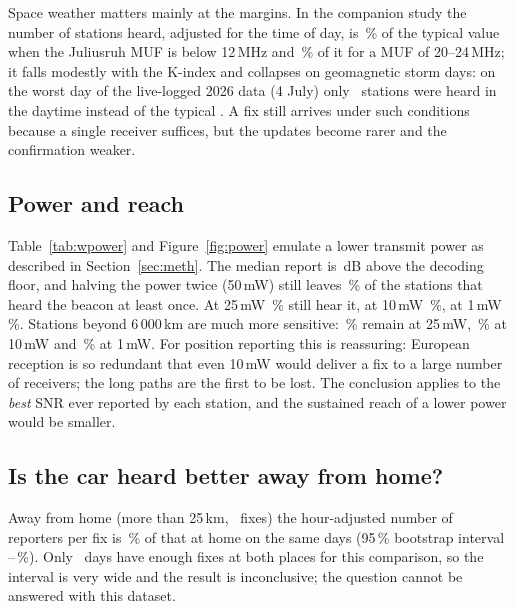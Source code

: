 \documentclass[10pt,a4paper]{article}
\begin{document}
Space weather matters mainly at the margins. In the companion study the number of stations heard, adjusted for the time of day, is \mufIdxLow\,\% of the typical value when the Juliusruh MUF is below 12\,MHz and \mufIdxMid\,\% of it for a MUF of 20--24\,MHz; it falls modestly with the K-index and collapses on geomagnetic storm days: on the worst day of the live-logged 2026 data (4 July) only \caseJulyRep\ stations were heard in the daytime instead of the typical \caseTypRep. A fix still arrives under such conditions because a single receiver suffices, but the updates become rarer and the confirmation weaker.

\subsection{Power and reach}
Table~\ref{tab:wpower} and Figure~\ref{fig:power} emulate a lower transmit power as described in Section~\ref{sec:meth}. The median report is \wStrongMargin\,dB above the decoding floor, and halving the power twice (50\,mW) still leaves \pwFifty\,\% of the stations that heard the beacon at least once. At 25\,mW \pwTwentyFive\,\% still hear it, at 10\,mW \pwTen\,\%, at 1\,mW \pwOne\,\%. Stations beyond 6\,000\,km are much more sensitive: \pwDxTwentyFive\,\% remain at 25\,mW, \pwDxTen\,\% at 10\,mW and \pwDxOne\,\% at 1\,mW. For position reporting this is reassuring: European reception is so redundant that even 10\,mW would deliver a fix to a large number of receivers; the long paths are the first to be lost. The conclusion applies to the \emph{best} SNR ever reported by each station, and the sustained reach of a lower power would be smaller.



\subsection{Is the car heard better away from home?}
Away from home (more than 25\,km, \wNAway\ fixes) the hour-adjusted number of reporters per fix is \wRelAway\,\% of that at home on the same days (95\,\% bootstrap interval \wRelAwayLo--\wRelAwayHi\,\%). Only \wPairDays\ days have enough fixes at both places for this comparison, so the interval is very wide and the result is inconclusive; the question cannot be answered with this dataset.
\end{document}
